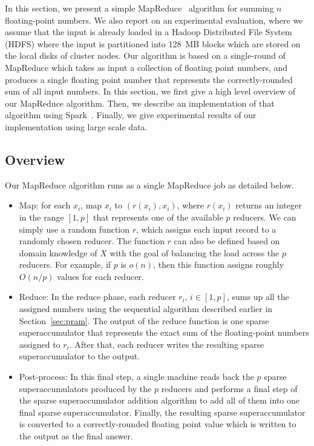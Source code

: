\documentclass[11pt]{article}
\begin{document}
In this section, we present a simple 
MapReduce~\cite{Dean:2008,mapsort,Karloff:2010} algorithm for summing $n$
floating-point numbers.
We also report on an experimental evaluation, where
we assume that the input is already loaded in a Hadoop Distributed File System
(HDFS) where the input is partitioned into 128~MB blocks which are stored on the
local disks of cluster nodes.
Our algorithm is based on a single-round of MapReduce which takes as
input a collection of floating point numbers, and produces a single floating
point number that represents the correctly-rounded sum of all input numbers.
In this section, we first give a high level overview of our MapReduce algorithm.
Then, we describe an implementation of that algorithm using Spark~\cite{ZCF+10}.
Finally, we give experimental results of our implementation using large scale data.

\subsection{Overview}
Our MapReduce algorithm runs as a single MapReduce job as detailed below.

\begin{itemize}
	\item Map: for each $x_i$, map $x_i$ to $(r(x_i),x_i)$, where 
	$r(x_i)$ returns an integer in the range $[1,p]$ that represents one of the
 available $p$ reducers. We can simply use a random function $r$, which assigns
 each input record to a randomly chosen reducer. The function $r$ can also be
 defined based on domain knowledge of $X$ with the goal of balancing the load
 across the $p$ reducers.
 For example, if $p$ is $o(n)$, then this function assigns roughly $O(n/p)$
 values for each reducer.

 \item Reduce: In the reduce phase, each reducer $r_i$, $i\in[1,p]$, sums up all
 the assigned numbers using the sequential algorithm described earlier in Section~\ref{sec:pram}.
 The output of the reduce function is one sparse superaccumulator that represents
 the exact sum of the floating-point numbers assigned to $r_i$.
 After that, each reducer writes the resulting sparse superaccumulator to the
 output.
 
 \item Post-process: In this final step, a single machine reads back the $p$
 sparse superaccumulators produced by the $p$ reducers and performs a final
 step of the sparse superaccumulator addition algorithm to add all of them
 into one final sparse superaccumulator. Finally, the resulting sparse superaccumulator
 is converted to a correctly-rounded floating point value which is written
 to the output as the final answer.
\end{itemize}
\end{document}
